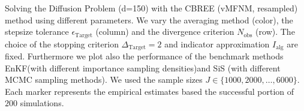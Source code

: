 Solving the Diffusion Problem (d=150) with the CBREE (vMFNM, resampled) method using  different parameters. We vary the averaging method (color), the stepsize tolerance $\epsilon_{\text{Target}}$ (column) and the divergence criterion $N_\text{obs}$ (row). The choice of the stopping criterion $\Delta_{\text{Target}} = 2$ and indicator approximation $I_\text{alg}$ are fixed. Furthermore we plot also the performance of the benchmark methods EnKF(with different importance sampling densities)and SiS (with different MCMC sampling methods). We used the sample sizes $J \in \{1000, 2000, \ldots, 6000\}$. Each marker represents the empirical estimates based the successful portion of $200$ simulations.